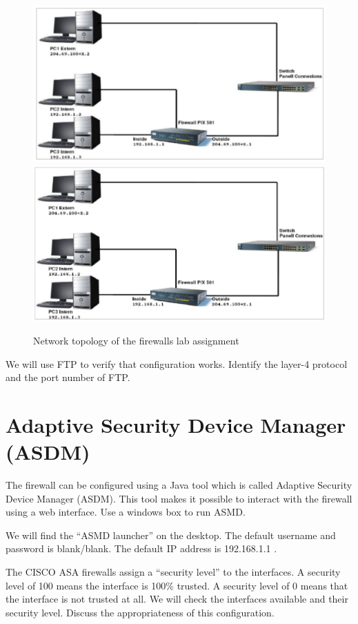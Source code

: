 \begin{figure}
\centering
\ifpdf
\includegraphics[width=0.9\linewidth]{Figures/firewall_topology.pdf}
\else
\includegraphics[width=0.9\linewidth]{Figures/firewall_topology.eps}
\fi
\caption{Network topology of the firewalls lab assignment}
\label{fig:firewall_topology}
\end{figure}

We will use FTP to verify that configuration works.
Identify the layer-4 protocol and the port number of FTP.

\section{Adaptive Security Device Manager (ASDM)}

The firewall can be configured using a Java tool which is called Adaptive Security Device Manager (ASDM).
This tool makes it possible to interact with the firewall using a web interface.
Use a windows box to run ASMD.

We will find the ``ASMD launcher'' on the desktop.
The default username and password is blank/blank.
The default IP address is 192.168.1.1 .

The CISCO ASA firewalls assign a ``security level'' to the interfaces.
A security level of 100 means the interface is 100\% trusted.
A security level of 0 means that the interface is not trusted at all.
We will check the interfaces available and their security level.
Discuss the appropriateness of this configuration.

